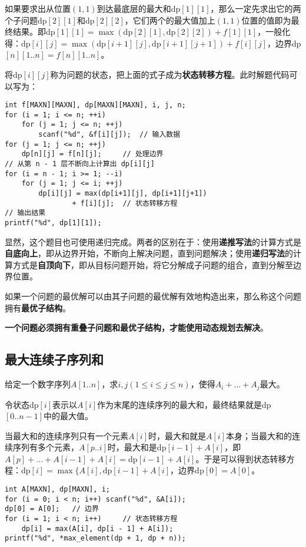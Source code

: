 如果要求出从位置$(1,1)$到达最底层的最大和dp$[1][1]$，那么一定先求出它的两个子问题dp$[2][1]$和dp$[2][2]$，它们两个的最大值加上$(1,1)$位置的值即为最终结果。即dp$[1][1]=\max(\textrm{dp}[2][1],\textrm{dp}[2][2])+f[1][1]$，一般化得：$\textrm{dp}[i][j]=\max(\textrm{dp}[i+1][j],\textrm{dp}[i+1][j+1])+f[i][j]$，边界dp$[n][1..n]=f[n][1..n]$。

将$\textrm{dp}[i][j]$称为问题的状态，把上面的式子成为\textbf{状态转移方程}。此时解题代码可以写为：

\begin{lstlisting}
int f[MAXN][MAXN], dp[MAXN][MAXN], i, j, n;
for (i = 1; i <= n; ++i)
	for (j = 1; j <= n; ++j)
		scanf("%d", &f[i][j]);	// 输入数据
for (j = 1; j <= n; ++j)
	dp[n][j] = f[n][j];		// 处理边界
// 从第 n - 1 层不断向上计算出 dp[i][j]
for (i = n - 1; i >= 1; --i)
	for (j = 1; j <= i; ++j)
		dp[i][j] = max(dp[i+1][j], dp[i+1][j+1])
				+ f[i][j];	// 状态转移方程
// 输出结果
printf("%d", dp[1][1]);
\end{lstlisting}

显然，这个题目也可使用递归完成。两者的区别在于：使用\textbf{递推写法}的计算方式是\textbf{自底向上}，即从边界开始，不断向上解决问题，直到问题解决；使用\textbf{递归写法}的计算方式是\textbf{自顶向下}，即从目标问题开始，将它分解成子问题的组合，直到分解至边界位置。

如果一个问题的最优解可以由其子问题的最优解有效地构造出来，那么称这个问题拥有\textbf{最优子结构}。

\textbf{一个问题必须拥有重叠子问题和最优子结构，才能使用动态规划去解决}。

\subsection{最大连续子序列和}

给定一个数字序列$A[1..n]$，求$i,j(1\leq i\leq j\leq n)$，使得$A_i+...+A_j$最大。

令状态dp$[i]$表示以$A[i]$作为末尾的连续序列的最大和，最终结果就是dp$[0..n-1]$中的最大值。

当最大和的连续序列只有一个元素$A[i]$时，最大和就是$A[i]$本身；当最大和的连续序列有多个元素，$A[p..i]$时，最大和是dp$[i-1]+A[i]$，即$A[p]+...+A[i-1]+A[i]=\textrm{dp}[i-1]+A[i]$。于是可以得到状态转移方程：dp$[i]=\max\{A[i],\textrm{dp}[i-1]+A[i]$，边界dp$[0]=A[0]$。

\begin{lstlisting}
int A[MAXN], dp[MAXN], i;
for (i = 0; i < n; i++)	scanf("%d", &A[i]);
dp[0] = A[0];	// 边界
for (i = 1; i < n; i++)		// 状态转移方程
	dp[i] = max(A[i], dp[i - 1] + A[i]);
printf("%d", *max_element(dp + 1, dp + n));
\end{lstlisting}

